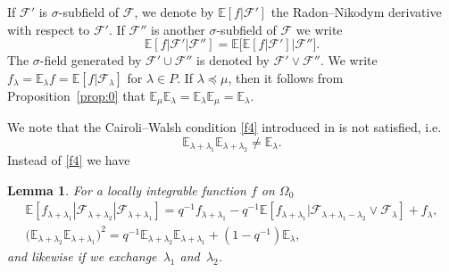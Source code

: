 \documentclass[a4paper]{amsart}
\newcommand{\EE}{\mathbb{E}}
\theoremstyle{plain}
\newtheorem{lemma}[proposition]{Lemma}
\theoremstyle{definition}
\theoremstyle{remark}
\numberwithin{equation}{section}
\theoremstyle{plain}
\begin{document}
If $\mathcal{F}'$ is $\sigma$-subfield of $\mathcal{F}$, we denote by
$\EE[f | \mathcal{F}']$ the Radon--Nikodym derivative with respect to
$\mathcal{F}'$. If $\mathcal{F}''$ is another $\sigma$-subfield of
$\mathcal{F}$ we write
\begin{equation*}
	\EE[f | \mathcal{F}' | \mathcal{F}'']
	  = \EE\big[\EE[f | \mathcal{F}'  ]\big| \mathcal{F}''\big].
\end{equation*}
The $\sigma$-field generated by $\mathcal{F}' \cup \mathcal{F}''$ is
denoted by $\mathcal{F}' \vee \mathcal{F}''$. We write $f_\lambda =
\EE_\lambda f = \EE[f | \mathcal{F}_\lambda]$ for $\lambda \in P$.
If $\lambda \preceq \mu$, then it follows from
Proposition~\ref{prop:0} that
$\EE_\mu\EE_\lambda=\EE_\lambda\EE_\mu=\EE_\lambda$.

We note that the Cairoli--Walsh condition \eqref{f4} introduced in \cite{carwal} is
not satisfied, i.e.
\begin{equation*}
	\EE_{\lambda+\lambda_1} \EE_{\lambda+\lambda_2} \neq \EE_\lambda.
\end{equation*}
Instead of \eqref{f4} we have
\begin{lemma}
\label{lem:1}
For a locally integrable function $f$ on $\Omega_0$
\begin{gather}
\label{eq:1}
\EE[f_{\lambda+\lambda_1} | \mathcal{F}_{\lambda+\lambda_2} |
  \mathcal{F}_{\lambda+\lambda_1}] =q^{-1} f_{\lambda+\lambda_1}
-q^{-1} \EE[f_{\lambda+\lambda_1} |
  \mathcal{F}_{\lambda+\lambda_1-\lambda_2} \vee \mathcal{F}_\lambda]
+f_\lambda,\\
\label{eq:23}
\big(\EE_{\lambda+\lambda_2} \EE_{\lambda+\lambda_1}\big)^2 = q^{-1}
\EE_{\lambda+\lambda_2} \EE_{\lambda+\lambda_1} + (1-q^{-1})
\EE_\lambda,
\end{gather}
and likewise if we exchange~$\lambda_1$ and~$\lambda_2$.
\end{lemma}
\end{document}
